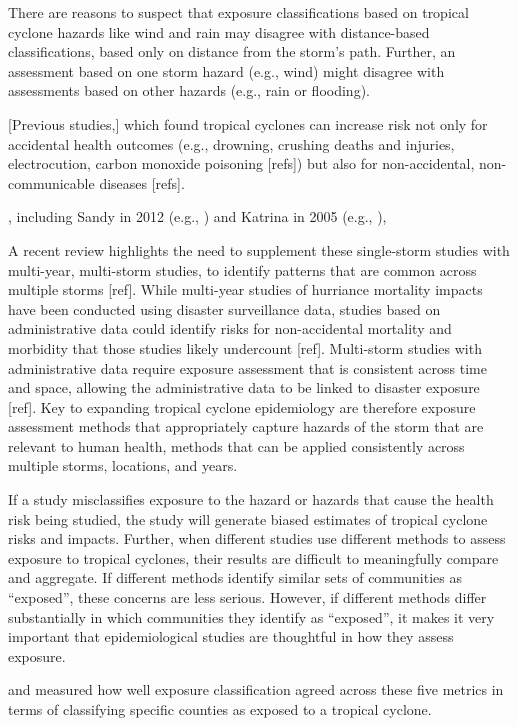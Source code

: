 There are reasons to suspect that
exposure classifications based on tropical cyclone hazards like wind and rain
may disagree with distance-based classifications, based only on distance from
the storm's path. Further, an assessment based on one storm hazard (e.g., wind)
might disagree with assessments based on other hazards (e.g., rain or
flooding).  

[Previous studies,] which found tropical cyclones can increase risk not only
for accidental health outcomes (e.g., drowning, crushing deaths and injuries,
electrocution, carbon monoxide poisoning [refs]) but also for non-accidental,
non-communicable diseases [refs].  

, including Sandy in 2012 (e.g., \parencite{swerdel2014}) and Katrina
in 2005 (e.g., \parencite{burton2009health}), 

A recent review highlights the need to supplement these single-storm studies
with multi-year, multi-storm studies, to identify patterns that are common
across multiple storms [ref]. While multi-year studies of hurriance mortality
impacts have been conducted using disaster surveillance data, studies based on
administrative data could identify risks for non-accidental mortality and
morbidity that those studies likely undercount [ref]. Multi-storm studies with
administrative data require exposure assessment that is consistent across time
and space, allowing the administrative data to be linked to disaster exposure
[ref]. Key to expanding tropical cyclone epidemiology are therefore exposure
assessment methods that appropriately capture hazards of the storm that are
relevant to human health, methods that can be applied consistently across
multiple storms, locations, and years. 

If a study misclassifies exposure to the hazard or hazards that cause the
health risk being studied, the study will generate biased estimates of tropical
cyclone risks and impacts. Further, when different studies use different
methods to assess exposure to tropical cyclones, their results are difficult to
meaningfully compare and aggregate. If different methods identify
similar sets of communities as ``exposed'',  these concerns are less serious.
However, if different methods differ substantially in which communities they
identify as ``exposed'', it makes it very important that epidemiological
studies are thoughtful in how they assess exposure.

 and
measured how well exposure classification agreed across these five metrics in
terms of classifying specific counties as exposed to a tropical cyclone.  

